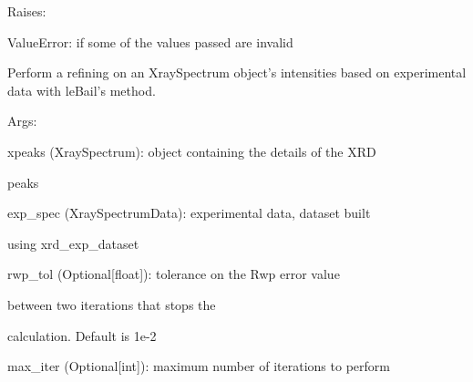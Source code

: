 \documentclass[letterpaper,10pt,english]{sphinxmanual}
\begin{document}
\begin{fulllineitems}
\begin{fulllineitems}
\begin{DUlineblock}{0em}
\item[] Raises:
\item[]
\begin{DUlineblock}{\DUlineblockindent}
\item[] ValueError: if some of the values passed are invalid
\end{DUlineblock}
\end{DUlineblock}

\end{fulllineitems}


\begin{fulllineitems}
\label{doctree/soprano.calculate.xrd.xrd:soprano.calculate.xrd.xrd.XRDCalculator.lebail_fit}
Perform a refining on an XraySpectrum object's intensities based on
experimental data with leBail's method.

\begin{DUlineblock}{0em}
\item[] Args:
\item[]
\begin{DUlineblock}{\DUlineblockindent}
\item[] xpeaks (XraySpectrum): object containing the details of the XRD
\item[]
\begin{DUlineblock}{\DUlineblockindent}
\item[] peaks
\end{DUlineblock}
\item[] exp\_spec (XraySpectrumData): experimental data, dataset built
\item[]
\begin{DUlineblock}{\DUlineblockindent}
\item[] using xrd\_exp\_dataset
\end{DUlineblock}
\item[] rwp\_tol (Optional{[}float{]}): tolerance on the Rwp error value
\item[]
\begin{DUlineblock}{\DUlineblockindent}
\item[] between two iterations that stops the
\item[] calculation. Default is 1e-2
\end{DUlineblock}
\item[] max\_iter (Optional{[}int{]}): maximum number of iterations to perform
\end{DUlineblock}
\end{DUlineblock}


\end{fulllineitems}
\end{fulllineitems}
\end{document}
